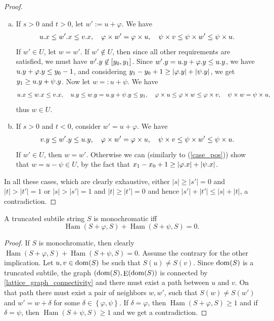 \documentclass[twoside,leqno]{article}
\let\Cref\cref
\renewcommand{\phi}{\varphi}
\newcommand{\set}[1]{\left\lbrace #1 \right\rbrace}
\newcommand{\eq}[1]{\begin{align*} #1 \end{align*}}
\DeclareMathOperator*{\Edges}{E}
\DeclareMathOperator*{\Ham}{Ham}
\newcommand{\absolute}[1]{\left\lvert#1\right\rvert}
\begin{document}
\begin{lemma}
\begin{proof}
\begin{enumerate}[(a)]
			\item If $s > 0$ and $t > 0$, let $w' := u + \phi$. \label{case_pos}
				We have \eq{
					\x{u} \le \x{w'} \le \x{v}, \quad \h{w'} = \h{u}, \quad \s{v} \le \s{w'} \le \s{u}.
				}
				If $w' \in U$, let $w = w'$.
				If $w' \not \in U$, then since all other requirements are satisfied, we must have $w'.y \not \in [y_0, y_1]$.
				Since $\y{w'} = \y{u} + \y{\phi} \le \y{u}$, we have $\y{u} + \y{\phi} \le y_0 - 1$, and
				considering $y_1 - y_0 + 1 \ge \absolute{\y{\phi}} + \absolute{\y{\psi}}$, we get $y_1 \ge u.y + \psi.y$.
				Now let $w =: u + \psi$.
				We have \eq{
					\x{u} \le \x{w} \le \x{v}, \quad \y{u} \le \y{w} = \y{u} + \y{\psi} \le y_1, \quad \h{u} \le \h{w} \le \h{v}, \quad \s{w} = \s{u},
				}
				thus $w \in U$.
			\item If $s > 0$ and $t < 0$, consider $w' = u + \phi$.
				We have \eq{
					\y{v} \le \y{w'} \le \y{u}, \quad \h{w'} = \h{u}, \quad \s{v} \le \s{w'} \le \s{u}.
				}
				If $w' \in U$, then $w = w'$.
				Otherwise we can (similarly to (\ref{case_pos})) show that $w = u - \psi \in U$, by the fact that $x_1 - x_0 + 1 \ge \absolute{\x{\phi}} + \absolute{\x{\psi}}$. 
		\end{enumerate}
		In all these cases, which are clearly exhaustive, either $\absolute{s} \ge \absolute{s'} = 0$ and $\absolute{t} > \absolute{t'} = 1$ or $\absolute{s} > \absolute{s'} = 1$ and $\absolute{t} \ge \absolute{t'} = 0$ and hence $\absolute{s'}+\absolute{t'} \le \absolute{s}+\absolute{t}$, a contradiction. 
	\end{proof}
\end{lemma}




\begin{lemma}\label{monochromacy_condition}
	A truncated subtile string $S$ is monochromatic iff
	\[\Ham(S + \phi, S) + \Ham(S + \psi, S) = 0.\]
	\begin{proof}
		If $S$ is monochromatic, then clearly $\Ham(S + \phi, S) + \Ham(S + \psi, S) = 0$.
		Assume the contrary for the other implication.
		Let $u, v \in \operatorname*{dom}(S)$ be such that $S(u) \neq S(v)$.
		Since $\operatorname*{dom}(S)$ is a truncated subtile, the graph $(\d{S}, \Edges(\d{S})$ is connected by \Cref{lattice_graph_connectivity} and there must exist a path between $u$ and $v$.
		On that path there must exist a pair of neighbors $w, w'$, such that $S(w) \neq S(w')$ and $w' = w + \delta$ for some $\delta \in \set{\phi, \psi}$.
		If $\delta = \phi$, then $\Ham(S + \phi, S) \ge 1$ and if $\delta = \psi$, then $\Ham(S + \psi, S) \ge 1$ and we get a contradiction.
	\end{proof}
\end{lemma}
\end{document}
